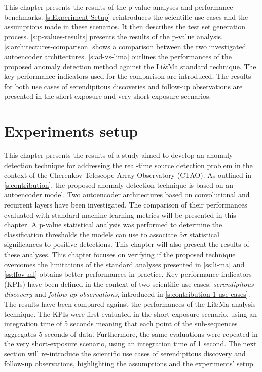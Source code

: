 \begin{chapabstract}
\small{
This chapter presents the results of the p-value analyses and performance benchmarks. \autoref{s:Experiment-Setup} reintroduces the scientific use cases and the assumptions made in these scenarios. It then describes the test set generation process. \autoref{s:p-values-results} presents the results of the p-value analysis. \autoref{s:architectures-comparison} shows a comparison between the two investigated autoencoder architectures. \autoref{s:ad-vs-lima} outlines the performances of the proposed anomaly detection method against the Li\&Ma standard technique. The key performance indicators used for the comparison are introduced. The results for both use cases of serendipitous discoveries and follow-up observations are presented in the short-exposure and very short-exposure scenarios.
}\\
\begin{center}
\noindent\makebox[0.8\linewidth]{\rule{0.66\paperwidth}{0.4pt}}
\end{center}
\vspace{1cm}
\end{chapabstract}

\section{Experiments setup}
\label{s:Experiment-Setup}
This chapter presents the results of a study aimed to develop an anomaly detection technique for addressing the real-time source detection problem in the context of the Cherenkov Telescope Array Observatory (CTAO). As outlined in \autoref{s:contribution}, the proposed anomaly detection technique is based on an autoencoder model. Two autoencoder architectures based on convolutional and recurrent layers have been investigated. The comparison of their performances evaluated with standard machine learning metrics will be presented in this chapter. A p-value statistical analysis was performed to determine the classification thresholds the models can use to associate $5\sigma$ statistical significances to positive detections. This chapter will also present the results of these analyses. 
This chapter focuses on verifying if the proposed technique overcomes the limitations of the standard analyses presented in \autoref{ss:li-ma} and \autoref{ss:ffov-ml} obtains better performances in practice. Key performance indicators (KPIs) have been defined in the context of two scientific use cases: \textit{serendipitous discovery} and \textit{follow-up observations}, introduced in \autoref{s:contribution-1-use-cases}. The results have been compared against the performances of the Li\&Ma analysis technique. The KPIs were first evaluated in the short-exposure scenario, using an integration time of 5 seconds meaning that each point of the sub-sequences aggregates 5 seconds of data. Furthermore, the same evaluations were repeated in the very short-exposure scenario, using an integration time of 1 second. The next section will re-introduce the scientific use cases of serendipitous discovery and follow-up observations, highlighting the assumptions and the experiments' setup.

